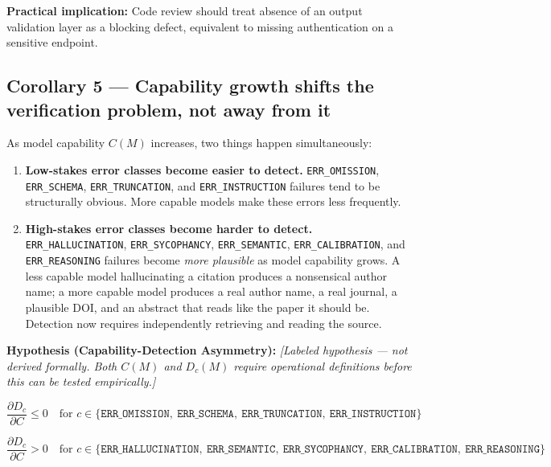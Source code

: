 \documentclass[11pt,a4paper]{article}
\begin{document}
\textbf{Practical implication:} Code review should treat absence of an output validation layer as a blocking defect, equivalent to missing authentication on a sensitive endpoint.

\subsection{Corollary 5 --- Capability growth shifts the verification problem, not away from it}

As model capability $C(M)$ increases, two things happen simultaneously:

\begin{enumerate}[nosep]
  \item \textbf{Low-stakes error classes become easier to detect.} \texttt{ERR\_OMISSION}, \texttt{ERR\_SCHEMA}, \texttt{ERR\_TRUNCATION}, and \texttt{ERR\_INSTRUCTION} failures tend to be structurally obvious. More capable models make these errors less frequently.

  \item \textbf{High-stakes error classes become harder to detect.} \texttt{ERR\_HALLUCINATION}, \texttt{ERR\_SYCOPHANCY}, \texttt{ERR\_SEMANTIC}, \texttt{ERR\_CALIBRATION}, and \texttt{ERR\_REASONING} failures become \emph{more plausible} as model capability grows. A less capable model hallucinating a citation produces a nonsensical author name; a more capable model produces a real author name, a real journal, a plausible DOI, and an abstract that reads like the paper it should be. Detection now requires independently retrieving and reading the source.
\end{enumerate}

\textbf{Hypothesis (Capability-Detection Asymmetry):} \emph{[Labeled hypothesis --- not derived formally. Both $C(M)$ and $D_c(M)$ require operational definitions before this can be tested empirically.]}

\begin{equation}
\frac{\partial D_c}{\partial C} \leq 0
\quad \text{for } c \in \bigl\{\texttt{ERR\_OMISSION},\ \texttt{ERR\_SCHEMA},\ \texttt{ERR\_TRUNCATION},\ \texttt{ERR\_INSTRUCTION}\bigr\}
\end{equation}

\begin{equation}
\frac{\partial D_c}{\partial C} > 0
\quad \text{for } c \in \bigl\{\texttt{ERR\_HALLUCINATION},\ \texttt{ERR\_SEMANTIC},\ \texttt{ERR\_SYCOPHANCY},\ \texttt{ERR\_CALIBRATION},\ \texttt{ERR\_REASONING}\bigr\}
\end{equation}
\end{document}
